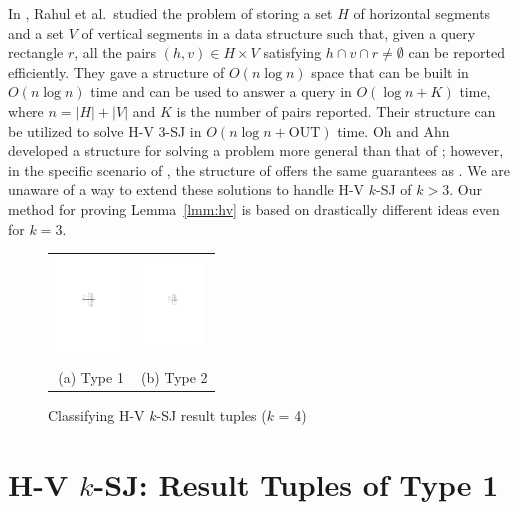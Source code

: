\documentclass[acmsmall,review,anonymous]{acmart}
\def\extraspacing{\vspace{2mm} \noindent}
\def\figcapup{\vspace{-2mm}}
\def\figcapdown{\vspace{-4mm}}
\def\out{\mathrm{OUT}}
\begin{document}
\extraspacing {\bf Remark.} In \cite{rdr+11}, Rahul et al.\ studied the problem of storing a set $H$ of horizontal segments and a set $V$ of vertical segments in a data structure such that, given a query rectangle $r$, all the pairs $(h, v) \in H \times V$ satisfying $h \cap v \cap r \ne \emptyset$ can be reported efficiently. They gave a structure of $O(n \log n)$ space that can be built in $O(n \log n)$ time and can be used to answer a query in $O(\log n + K)$ time, where $n = |H| + |V|$ and $K$ is the number of pairs reported. Their structure can be utilized to solve H-V 3-SJ in $O(n \log n + \out)$ time. Oh and Ahn \cite{oa19} developed a structure for solving a problem more general than that of \cite{rdr+11}; however, in the specific scenario of \cite{rdr+11}, the structure of \cite{oa19} offers the same guarantees as \cite{rdr+11}. We are unaware of a way to extend these solutions to handle H-V $k$-SJ of $k > 3$. Our method for proving Lemma~\ref{lmm:hv} is based on drastically different ideas even for $k = 3$.


\begin{figure}
    \begin{tabular}{cc}
        \includegraphics[height=27mm]{./artwork/type1} &
        \hspace{5mm} \includegraphics[height=23mm]{./artwork/type2} \\
        (a) Type 1 &
        (b) Type 2
    \end{tabular}

    \figcapup
    \caption{Classifying H-V $k$-SJ result tuples ($k$ = 4)}
    \label{fig:hv:types}
    \figcapdown
\end{figure}

\section{H-V $k$-SJ: Result Tuples of Type 1} \label{sec:hv:type1}
\end{document}
